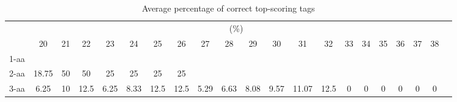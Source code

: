 \begin{table}[h]\tiny
\vspace{3mm}
{\centering
\begin{center}
\begin{tabular}{|l|c|c|c|c|c|c|c|c|c|c|c|c|c|c|c|c|c|c|c|c|}
  \hline
  & \multicolumn{ 19 }{|c|}{(\%)} \\
  \cline{2- 20}
    & 20 & 21 & 22 & 23 & 24 & 25 & 26 & 27 & 28 & 29 & 30 & 31 & 32 & 33 & 34 & 35 & 36 & 37 & 38\\
  \hline
1-aa  &  &  &  &  &  &  &  &  &  &  &  &  &  &  &  &  &  &  & \\
2-aa  & 18.75 & 50 & 50 & 25 & 25 & 25 & 25 &  &  &  &  &  &  &  &  &  &  &  & \\
3-aa  & 6.25 & 10 & 12.5 & 6.25 & 8.33 & 12.5 & 12.5 & 5.29 & 6.63 & 8.08 & 9.57 & 11.07 & 12.5 & 0 & 0 & 0 & 0 & 0 & 0\\
 \hline
\end{tabular}
\end{center}
\par}
\centering

\caption{ Average percentage of correct top-scoring tags}

\vspace{3mm}
\label{table:k}
\end{table}
